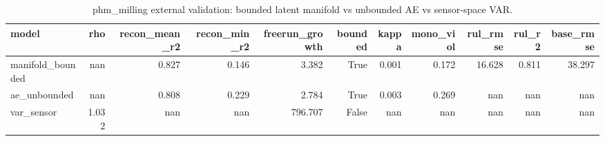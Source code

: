 \begin{table}[t]
\centering
\caption{phm_milling external validation: bounded latent manifold vs unbounded AE vs sensor-space VAR.}
\label{tab:phm_milling}
\begin{tabular}{lrrrrrrrrrr}
\toprule
model & rho & recon\_mean\_r2 & recon\_min\_r2 & freerun\_growth & bounded & kappa & mono\_viol & rul\_rmse & rul\_r2 & base\_rmse \\
\midrule
manifold\_bounded & nan & 0.827 & 0.146 & 3.382 & True & 0.001 & 0.172 & 16.628 & 0.811 & 38.297 \\
ae\_unbounded & nan & 0.808 & 0.229 & 2.784 & True & 0.003 & 0.269 & nan & nan & nan \\
var\_sensor & 1.032 & nan & nan & 796.707 & False & nan & nan & nan & nan & nan \\
\bottomrule
\end{tabular}
\end{table}